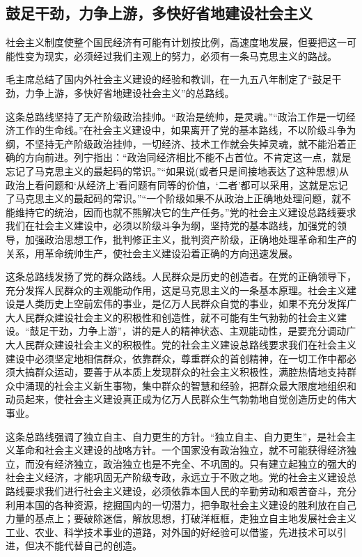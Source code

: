 \documentclass{book}
\begin{document}
\subsection{鼓足干劲，力争上游，多快好省地建设社会主义}

社会主义制度使整个国民经济有可能有计划按比例，高速度地发展，但要把这一可能性变为现实，必须经过我们主观上的努力，必须有一条马克思主义的路战。

毛主席总结了国内外社会主义建设的经验和教训，在一九五八年制定了“鼓足干劲，力争上游，多快好省地建设社会主义”的总路线。

这条总路线坚持了无产阶级政治挂帅。“政治是统帅，是灵魂。”“政治工作是一切经济工作的生命线。”在社会主义建设中，如果离开了党的基本路线，不以阶级斗争为纲，不坚持无产阶级政治挂帅，一切经济、技术工作就会失掉灵魂，就不能沿着正确的方向前进。列宁指出：“政治同经济相比不能不占首位。不肯定这一点，就是忘记了马克思主义的最起码的常识。”“如果说(或者只是间接地表达了这种思想)从政治上看问题和‘从经济上’看问题有同等的价值，‘二者’都可以采用，这就是忘记了马克思主义的最起码的常识。”“一个阶级如果不从政治上正确地处理问题，就不能维持它的统治，因而也就不熊解决它的生产任务。”党的社会主义建设总路线要求我们在社会主义建设中，必须以阶级斗争为纲，坚持党的基本路线，加强党的领导，加强政治思想工作，批判修正主义，批判资产阶级，正确地处理革命和生产的关系，用革命统帅生产，使社会主义建设沿着正确的方向迅速发展。

这条总路线发扬了党的群众路线。人民群众是历史的创造者。在党的正确领导下，充分发挥人民群众的主观能动作用，这是马克思主义的一条基本原理。社会主义建设是人类历史上空前宏伟的事业，是亿万人民群众自觉的事业，如果不充分发挥广大人民群众建设社会主义的积极性和创造性，就不可能有生气勃勃的社会主义建设。“鼓足干劲，力争上游”，讲的是人的精神状态、主观能动性，是要充分调动广大人民群众建设社会主义的积极性。党的社会主义建设总路线要求我们在社会主义建设中必须坚定地相信群众，依靠群众，尊重群众的首创精神，在一切工作中都必须大搞群众运动，要善于从本质上发现群众的社会主义积极性，满腔热情地支持群众中涌现的社会主义新生事物，集中群众的智慧和经验，把群众最大限度地组织和动员起来，使社会主义建设真正成为亿万人民群众生气勃勃地自觉创造历史的伟大事业。

这条总路线强调了独立自主、自力更生的方针。“独立自主、自力更生”，是社会主义革命和社会主义建设的战咯方针。一个国家没有政治独立，就不可能获得经济独立，而没有经济独立，政治独立也是不完全、不巩固的。只有建立起独立的强大的社会主义经济，才能巩固无产阶级专政，永远立于不败之地。党的社会主义建设总路线要求我们进行社会主义建设，必须依靠本国人民的辛勤劳动和艰苦奋斗，充分利用本国的各种资源，挖掘国内的一切潜力，把争取社会主义建设的胜利放在自己力量的基点上；要破除迷信，解放思想，打破洋框框，走独立自主地发展社会主义工业、农业、科学技术事业的道路，对外国的好经验可以借鉴，先进技术可以引进，但决不能代替自己的创造。
\end{document}
